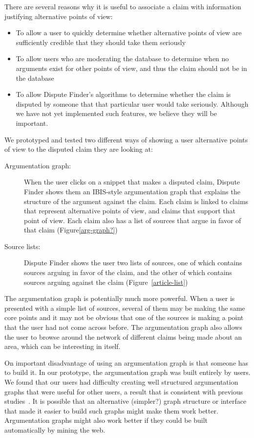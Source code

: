 \documentclass{www2010-submission}
\begin{document}
There are several reasons why it is useful to associate a claim with information justifying alternative points of view:

\begin{itemize}
\item To allow a user to quickly determine whether alternative points of view are sufficiently credible that they should take them seriously
\item To allow users who are moderating the database to determine when no arguments exist for other points of view, and thus the claim should not be in the database
\item To allow Dispute Finder's algorithms to determine whether the claim is disputed by someone that that particular user would take seriously. Although we have not yet implemented such features, we believe they will be important.
\end{itemize}

We prototyped and tested two different ways of showing a user alternative points of view to the disputed claim they are looking at:

\begin{description}
\item[Argumentation graph:] When the user clicks on a snippet that makes a disputed claim, Dispute Finder shows them an IBIS-style\cite{gibis} argumentation graph that explains the structure of the argument against the claim. Each claim is linked to claims that represent alternative points of view, and claims that support that point of view. Each claim also has a list of sources that argue in favor of that claim (Figure\ref{arg-graph?})

\item[Source lists:] Dispute Finder shows the user two lists of sources, one of which contains sources arguing in favor of the claim, and the other of which contains sources arguing against the claim (Figure~\ref{article-list})
\end{description}

The argumentation graph is potentially much more powerful. When a user is presented with a simple list of sources, several of them may be making the same core points and it may not be obvious that one of the sources is making a point that the user had not come across before. The argumentation graph also allows the user to browse around the network of different claims being made about an area, which can be interesting in itself.

On important disadvantage of using an argumentation graph is that someone has to build it. In our prototype, the argumentation graph was built entirely by users. We found that our users had difficulty creating well structured argumentation graphs that were useful for other users, a result that is consistent with previous studies~\cite{ibis-bad?}. It is possible that an alternative (simpler?) graph structure or interface that made it easier to build such graphs might make them work better. Argumentation graphs might also work better if they could be built automatically by mining the web.
\end{document}
